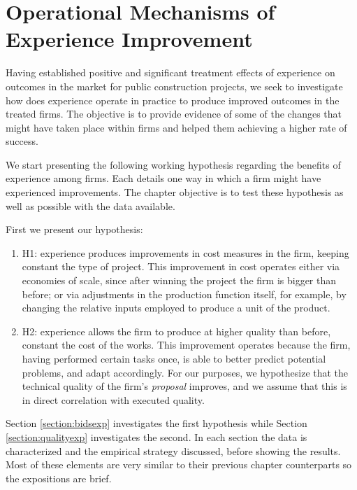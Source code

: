 \chapter{Operational Mechanisms of Experience Improvement}
Having established positive and significant treatment effects of  experience on outcomes in the market for public construction projects, we seek to investigate how does experience operate in practice to produce improved outcomes in the treated firms. The objective is to provide evidence of some of the changes that might have taken place within firms and helped them achieving a higher rate of success.

We start presenting the following working hypothesis regarding the benefits of experience among firms. Each details one way in which a firm might have experienced improvements. The chapter objective is to test these hypothesis as well as possible with the data available.

First we present our hypothesis:
\begin{enumerate}
  \item{H1}: experience produces improvements in cost measures in the firm, keeping constant the type of project. This improvement in cost operates either via economies of scale, since after winning the project the firm is bigger than before; or via adjustments in the production function itself, for example, by changing the relative inputs employed to produce a unit of the product.
  \item{H2}: experience allows the firm to produce at higher quality than before, constant the cost of the works. This improvement operates because the firm, having performed certain tasks once, is able to better predict potential problems, and adapt accordingly. For our purposes, we hypothesize that the technical quality of the firm's \textit{proposal} improves, and we assume that this is in direct correlation with executed quality.
\end{enumerate}

Section \ref{section:bidsexp} investigates the first hypothesis while Section \ref{section:qualityexp} investigates the second. In each section the data is characterized and the empirical strategy discussed, before showing the results. Most of these elements are very similar to their previous chapter counterparts so the expositions are brief.

